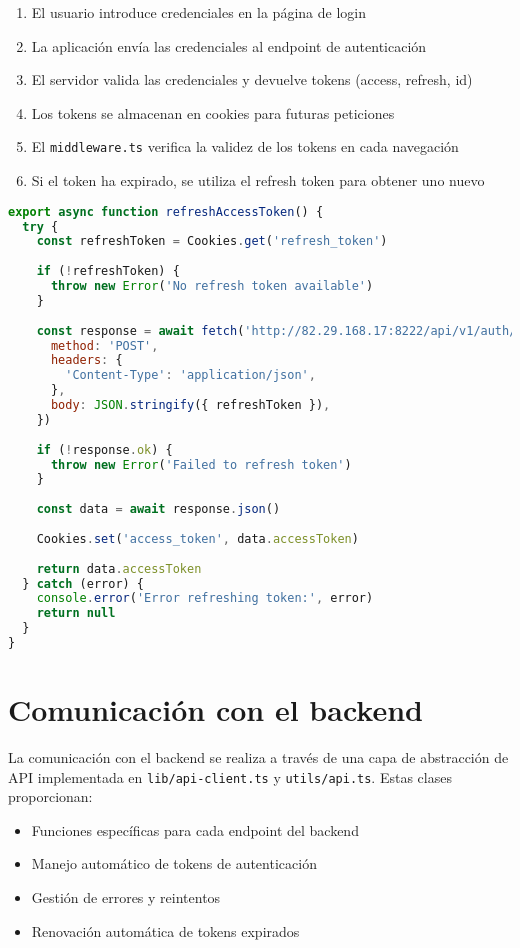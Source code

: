 \documentclass[12pt,a4paper]{report}
\begin{document}
\begin{enumerate}
    \item El usuario introduce credenciales en la página de login
    \item La aplicación envía las credenciales al endpoint de autenticación
    \item El servidor valida las credenciales y devuelve tokens (access, refresh, id)
    \item Los tokens se almacenan en cookies para futuras peticiones
    \item El \texttt{middleware.ts} verifica la validez de los tokens en cada navegación
    \item Si el token ha expirado, se utiliza el refresh token para obtener uno nuevo
\end{enumerate}

\begin{lstlisting}[language=JavaScript, caption=Función de autenticación en lib/auth.ts]
export async function refreshAccessToken() {
  try {
    const refreshToken = Cookies.get('refresh_token')
    
    if (!refreshToken) {
      throw new Error('No refresh token available')
    }
    
    const response = await fetch('http://82.29.168.17:8222/api/v1/auth/refresh-token', {
      method: 'POST',
      headers: {
        'Content-Type': 'application/json',
      },
      body: JSON.stringify({ refreshToken }),
    })
    
    if (!response.ok) {
      throw new Error('Failed to refresh token')
    }
    
    const data = await response.json()
    
    Cookies.set('access_token', data.accessToken)
    
    return data.accessToken
  } catch (error) {
    console.error('Error refreshing token:', error)
    return null
  }
}
\end{lstlisting}

\section{Comunicación con el backend}
La comunicación con el backend se realiza a través de una capa de abstracción de API implementada en \texttt{lib/api-client.ts} y \texttt{utils/api.ts}. Estas clases proporcionan:

\begin{itemize}
    \item Funciones específicas para cada endpoint del backend
    \item Manejo automático de tokens de autenticación
    \item Gestión de errores y reintentos
    \item Renovación automática de tokens expirados
\end{itemize}
\end{document}
